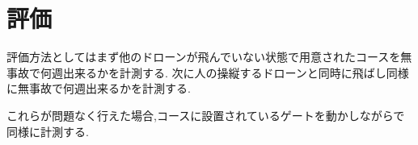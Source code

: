\section{評価}
評価方法としてはまず他のドローンが飛んでいない状態で用意されたコースを無事故で何週出来るかを計測する.
次に人の操縦するドローンと同時に飛ばし同様に無事故で何週出来るかを計測する.

これらが問題なく行えた場合,コースに設置されているゲートを動かしながらで同様に計測する.
